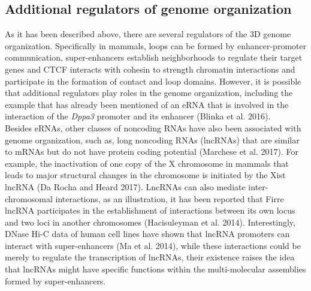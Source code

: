		\subsection{Additional regulators of genome organization}

As it has been described above, there are several regulators of the 3D genome organization. Specifically in mammals, loops can be formed by enhancer-promoter communication, super-enhancers establish neighborhoods to regulate their target genes and CTCF interacts with cohesin to strength chromatin interactions and participate in the formation of contact and loop domains. However, it is possible that additional regulators play roles in the genome organization, including the example that has already been mentioned of an eRNA that is involved in the interaction of the \textit{Dppa3} promoter and its enhancer (Blinka et al. 2016).\\

Besides eRNAs, other classes of noncoding RNAs have also been associated with genome organization, such as, long noncoding RNAs (lncRNAs) that are similar to mRNAs but do not have protein coding potential (Marchese et al. 2017). For example, the inactivation of one copy of the X chromosome in mammals that leads to major structural changes in the chromosome is initiated by the Xist lncRNA (Da Rocha and Heard 2017). LncRNAs can also mediate inter-chromosomal interactions, as an illustration, it has been reported that Firre lncRNA participates in the establishment of interactions between its own locus and two loci in another chromosomes (Hacisuleyman et al. 2014). Interestingly, DNase Hi-C data of human cell lines have shown that lncRNA promoters can interact with super-enhancers (Ma et al. 2014), while these interactions could be merely to regulate the transcription of lncRNAs, their existence raises the idea that lncRNAs might have specific functions within the multi-molecular assemblies formed by super-enhancers.\\

